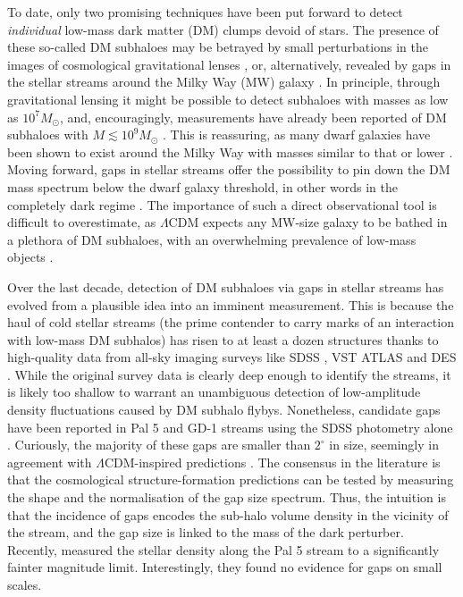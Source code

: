 \documentclass[useAMS,usenatbib]{mn2e}
\begin{document}
To date, only two promising techniques have been put forward to detect
{\it individual} low-mass dark matter (DM) clumps devoid of stars. The
presence of these so-called DM subhaloes may be betrayed by small
perturbations in the images of cosmological gravitational lenses
\citep[see e.g.][]{Mao1998, Dalal2002, Hezaveh2013}, or,
alternatively, revealed by gaps in the stellar streams around the
Milky Way (MW) galaxy \citep[see
  e.g.][]{ibata_et_al_2002,johnston_et_al_2002,siegal_valluri_2008,carlberg_2009}. In
principle, through gravitational lensing it might be possible to
detect subhaloes with masses as low as $10^7 M_{\odot}$, and,
encouragingly, measurements have already been reported of DM subhaloes
with $M \lesssim 10^9 M_{\odot}$ \citep[see
  e.g.][]{Vegetti2010,Vegetti2012,Hezaveh2016}. This is reassuring, as
many dwarf galaxies have been shown to exist around the Milky Way with
masses similar to that or lower \citep[see
  e.g.][]{belokurov2013}. Moving forward, gaps in stellar streams
offer the possibility to pin down the DM mass spectrum below the dwarf
galaxy threshold, in other words in the completely dark regime
\citep[see e.g.][]{subhalo_properties}. The importance of such a
direct observational tool is difficult to overestimate, as
$\Lambda$CDM expects any MW-size galaxy to be bathed in a plethora of
DM subhaloes, with an overwhelming prevalence of low-mass objects
\citep[see e.g.][]{springel_et_al_2008}.

Over the last decade, detection of DM subhaloes via gaps in stellar
streams has evolved from a plausible idea into an imminent
measurement. This is because the haul of cold stellar streams (the
prime contender to carry marks of an interaction with low-mass DM
subhalos) has risen to at least a dozen structures
\citep{stream_book_grillmair_carlin} thanks to high-quality data from
all-sky imaging surveys like SDSS \citep[see e.g.][]{sdssdr9}, VST
ATLAS \citep[][]{shanks2015} and DES \citep[][]{des_survey}. While the
original survey data is clearly deep enough to identify the streams,
it is likely too shallow to warrant an unambiguous detection of
low-amplitude density fluctuations caused by DM subhalo
flybys. Nonetheless, candidate gaps have been reported in Pal 5 \citep{pal5disc} and
GD-1 \citep{gd1disc} streams using the SDSS photometry alone \citep[see
  e.g.][]{carlberg_pal5_2012,carlberg_gd1_2013}. Curiously, the
majority of these gaps are smaller than $2^{\circ}$ in size, seemingly
in agreement with $\Lambda$CDM-inspired predictions \citep[see
  e.g.][]{yoon_etal_2011,carlberg_2012,ngan2014}. The consensus in the
literature is that the cosmological structure-formation predictions
can be tested by measuring the shape and the normalisation of the gap
size spectrum. Thus, the intuition is that the incidence of gaps
encodes the sub-halo volume density in the vicinity of the stream, and
the gap size is linked to the mass of the dark perturber. Recently,
\cite{ibata_et_al_pal5} measured the stellar density along the Pal 5
stream to a significantly fainter magnitude limit. Interestingly, they
found no evidence for gaps on small scales.
\end{document}
